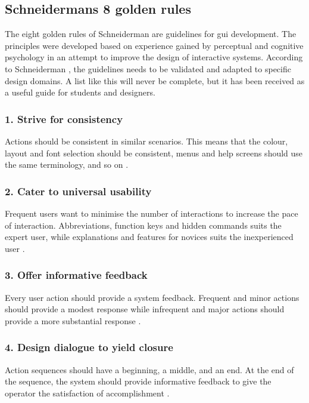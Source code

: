 \subsection{Schneidermans 8 golden rules}
\label{sec:schneiderman}
The eight golden rules of Schneiderman are guidelines for \acrshort{gui} development. The principles were developed based on experience gained by perceptual and cognitive psychology in an attempt to improve the design of interactive systems. According to Schneiderman \cite{schneiderman}, the guidelines needs to be validated and adapted to specific design domains. A list like this will never be complete, but it has been received as a useful guide for students and designers.

\subsubsection{1. Strive for consistency}
Actions should be consistent in similar scenarios. This means that the colour, layout and font selection should be consistent, menus and help screens should use the same terminology, and so on \cite{schneiderman}.

\subsubsection{2. Cater to universal usability}
Frequent users want to minimise the number of interactions to increase the pace of interaction. Abbreviations, function keys and hidden commands suits the expert user, while explanations and features for novices suits the inexperienced user \cite{schneiderman}.

\subsubsection{3. Offer informative feedback}
Every user action should provide a system feedback. Frequent and minor actions should provide a modest response while infrequent and major actions should provide a more substantial response \cite{schneiderman}.

\subsubsection{4. Design dialogue to yield closure}
Action sequences should have a beginning, a middle, and an end. At the end of the sequence, the system should provide informative feedback to give the operator the satisfaction of accomplishment \cite{schneiderman}.

